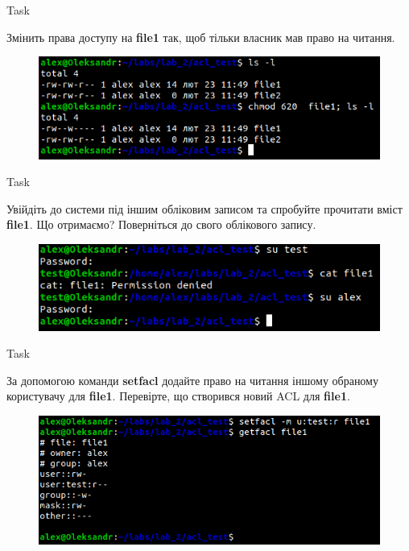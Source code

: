 \documentclass[a4paper,12pt]{article}
\newcommand{\RomanNumeralCaps}[1]{\MakeUppercase{\romannumeral #1}}
\begin{document}
    \begin{center}
        \Large{Task \RomanNumeralCaps{17}}
    \end{center}
    Змінить права доступу на \textbf{file1} так, щоб тільки власник мав право на читання.
    \begin{figure}[h!]
        \begin{minipage}[h]{1\linewidth}
            \centering
            \includegraphics[width=0.6\linewidth]{Prt sc/Figure_17.png}  
        \end{minipage}
    \end{figure}

\newpage
    \begin{center}
        \Large{Task \RomanNumeralCaps{18}}
    \end{center}
    Увійдіть до системи під іншим обліковим записом та спробуйте прочитати вміст \textbf{file1}. Що отримаємо? Поверніться до свого облікового запису.
    \begin{figure}[h!]
        \begin{minipage}[h]{1\linewidth}
            \centering
            \includegraphics[width=0.6\linewidth]{Prt sc/Figure_18.png}  
        \end{minipage}
    \end{figure}

    \begin{center}
        \Large{Task \RomanNumeralCaps{19}}
    \end{center}
    За допомогою команди \textbf{setfacl} додайте право на читання іншому обраному користувачу для \textbf{file1}. Перевірте, що створився новий ACL для \textbf{file1}.
    \begin{figure}[h!]
        \begin{minipage}[h]{1\linewidth}
            \centering
            \includegraphics[width=0.6\linewidth]{Prt sc/Figure_19.png}  
    
        \end{minipage}
    \end{figure}
\end{document}
